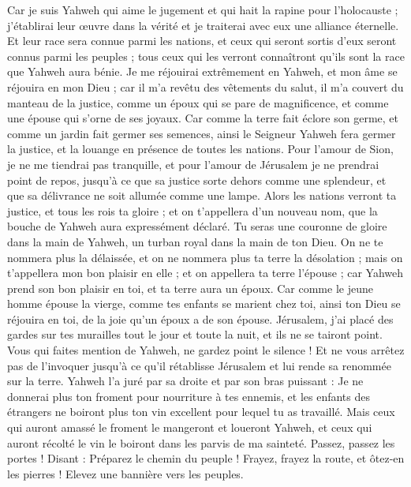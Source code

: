 \begin{multicols}{2}
Car je suis Yahweh qui aime le jugement et qui hait la rapine pour l'holocauste ; j'établirai leur œuvre dans la vérité et je traiterai avec eux une alliance éternelle.
Et leur race sera connue parmi les nations, et ceux qui seront sortis d'eux seront connus parmi les peuples ; tous ceux qui les verront connaîtront qu'ils sont la race que Yahweh aura bénie.
Je me réjouirai extrêmement en Yahweh, et mon âme se réjouira en mon Dieu ; car il m'a revêtu des vêtements du salut, il m'a couvert du manteau de la justice, comme un époux qui se pare de magnificence, et comme une épouse qui s'orne de ses joyaux.
Car comme la terre fait éclore son germe, et comme un jardin fait germer ses semences, ainsi le Seigneur Yahweh fera germer la justice, et la louange en présence de toutes les nations.
\VerseOne{}Pour l'amour de Sion, je ne me tiendrai pas tranquille, et pour l'amour de Jérusalem je ne prendrai point de repos, jusqu'à ce que sa justice sorte dehors comme une splendeur, et que sa délivrance ne soit allumée comme une lampe.
Alors les nations verront ta justice, et tous les rois ta gloire ; et on t'appellera d'un nouveau nom, que la bouche de Yahweh aura expressément déclaré.
Tu seras une couronne de gloire dans la main de Yahweh, un turban royal dans la main de ton Dieu.
On ne te nommera plus la délaissée, et on ne nommera plus ta terre la désolation ; mais on t'appellera mon bon plaisir en elle ; et on appellera ta terre l'épouse ; car Yahweh prend son bon plaisir en toi, et ta terre aura un époux.
Car comme le jeune homme épouse la vierge, comme tes enfants se marient chez toi, ainsi ton Dieu se réjouira en toi, de la joie qu'un époux a de son épouse.
Jérusalem, j'ai placé des gardes sur tes murailles tout le jour et toute la nuit, et ils ne se tairont point. Vous qui faites mention de Yahweh, ne gardez point le silence !
Et ne vous arrêtez pas de l'invoquer jusqu'à ce qu'il rétablisse Jérusalem et lui rende sa renommée sur la terre.
Yahweh l'a juré par sa droite et par son bras puissant : Je ne donnerai plus ton froment pour nourriture à tes ennemis, et les enfants des étrangers ne boiront plus ton vin excellent pour lequel tu as travaillé.
Mais ceux qui auront amassé le froment le mangeront et loueront Yahweh, et ceux qui auront récolté le vin le boiront dans les parvis de ma sainteté.
Passez, passez les portes ! Disant : Préparez le chemin du peuple ! Frayez, frayez la route, et ôtez-en les pierres ! Elevez une bannière vers les peuples.

\end{multicols}
